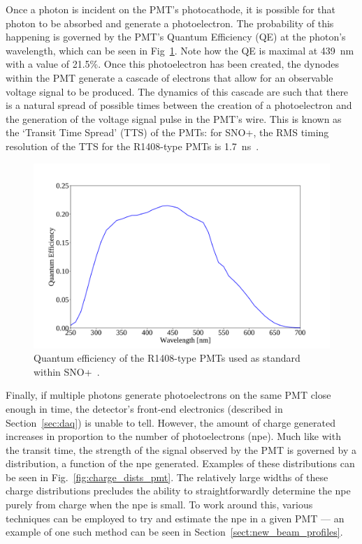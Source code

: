 Once a photon is incident on the PMT's photocathode, it is possible for that photon to be absorbed and generate a photoelectron. The probability of this happening is governed by the PMT's Quantum Efficiency (QE) at the photon's wavelength, which can be seen in Fig~\ref{fig:qe_pmts}. %
Note how the QE is maximal at \SI{439}{\nm} with a value of 21.5\%. Once this photoelectron has been created, the dynodes within the PMT generate a cascade of electrons that allow for an observable voltage signal to be produced. The dynamics of this cascade are such that there is a natural spread of possible times between the creation of a photoelectron and the generation of the voltage signal pulse in the PMT's wire. This is known as the `Transit Time Spread' (TTS) of the PMTs: for SNO+, the RMS timing resolution of the TTS for the R1408-type PMTs is \SI{1.7}{\ns}~\cite{}. %

\begin{figure}
    \centering
    \includegraphics[width=0.8\linewidth]{2_Detector/Figs/qe_plot.pdf}
    \caption[Quantum efficiency of the R1408-type PMTs used as standard within SNO+]{Quantum efficiency of the R1408-type PMTs used as standard within SNO+~\cite{}. %
    }
    \label{fig:qe_pmts}
\end{figure}

Finally, if multiple photons generate photoelectrons on the same PMT close enough in time, the detector's front-end electronics (described in Section~\ref{sec:daq}) is unable to tell. However, the amount of charge generated increases in proportion to the number of photoelectrons (npe). Much like with the transit time, the strength of the signal observed by the PMT is governed by a distribution, a function of the npe generated. Examples of these distributions can be seen in Fig.~\ref{fig:charge_dists_pmt}. %
The relatively large widths of these charge distributions precludes the ability to straightforwardly determine the npe purely from charge when the npe is small. To work around this, various techniques can be employed to try and estimate the npe in a given PMT --- an example of one such method can be seen in Section~\ref{sect:new_beam_profiles}.

